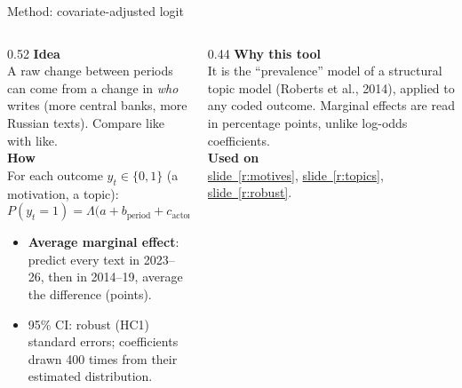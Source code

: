 \documentclass[aspectratio=169,10pt]{beamer}
\newcommand{\usedon}[1]{\hyperref[#1]{\textcolor{c4}{slide~\ref*{#1}}}}
\newcommand{\mhead}[1]{\textcolor{c1}{\textbf{#1}}\\[1pt]}
\begin{document}
\begin{frame}{Method: covariate-adjusted logit}
\begin{columns}[T]
\begin{column}{0.52\textwidth}\footnotesize
\mhead{Idea}
A raw change between periods can come from a change in \emph{who} writes (more central banks, more Russian texts). Compare like with like.\\[4pt]
\mhead{How}
For each outcome $y_t \in\{0,1\}$ (a motivation, a topic):
\[ P(y_t=1) = \Lambda\big(a + b_{\text{period}} + c_{\text{actor}} + e\cdot\text{English}\big) \]
\begin{itemize}\setlength\itemsep{1pt}
\item \textbf{Average marginal effect}: predict every text in 2023--26, then in 2014--19, average the difference (points).
\item 95\% CI: robust (HC1) standard errors; coefficients drawn 400 times from their estimated distribution.
\end{itemize}
\end{column}
\begin{column}{0.44\textwidth}\footnotesize
\mhead{Why this tool}
It is the ``prevalence'' model of a structural topic model (Roberts et al., 2014), applied to any coded outcome. Marginal effects are read in percentage points, unlike log-odds coefficients.\\[6pt]
\mhead{Used on}
\usedon{r:motives}, \usedon{r:topics}, \usedon{r:robust}.
\end{column}
\end{columns}
\end{frame}
\end{document}
